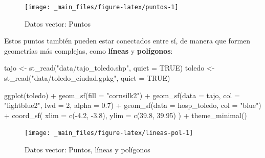 \documentclass[
]{book}
\newenvironment{Shaded}{\begin{snugshade}}{\end{snugshade}}
\newcommand{\AttributeTok}[1]{\textcolor[rgb]{0.77,0.63,0.00}{#1}}
\newcommand{\ConstantTok}[1]{\textcolor[rgb]{0.00,0.00,0.00}{#1}}
\newcommand{\DecValTok}[1]{\textcolor[rgb]{0.00,0.00,0.81}{#1}}
\newcommand{\FloatTok}[1]{\textcolor[rgb]{0.00,0.00,0.81}{#1}}
\newcommand{\FunctionTok}[1]{\textcolor[rgb]{0.00,0.00,0.00}{#1}}
\newcommand{\NormalTok}[1]{#1}
\newcommand{\OtherTok}[1]{\textcolor[rgb]{0.56,0.35,0.01}{#1}}
\newcommand{\SpecialCharTok}[1]{\textcolor[rgb]{0.00,0.00,0.00}{#1}}
\newcommand{\StringTok}[1]{\textcolor[rgb]{0.31,0.60,0.02}{#1}}
\begin{document}
\begin{figure}

{\centering \texttt{[image: \_main\_files/figure-latex/puntos-1]} 

}

\caption{Datos vector: Puntos}\label{fig:puntos}
\end{figure}

Estos puntos también pueden estar conectados entre sí, de manera que formen
geometrías más complejas, como \textbf{líneas} y \textbf{polígonos}:

\begin{Shaded}
\begin{Highlighting}[]

\NormalTok{tajo }\OtherTok{\textless{}{-}} \FunctionTok{st\_read}\NormalTok{(}\StringTok{"data/tajo\_toledo.shp"}\NormalTok{, }\AttributeTok{quiet =} \ConstantTok{TRUE}\NormalTok{)}
\NormalTok{toledo }\OtherTok{\textless{}{-}} \FunctionTok{st\_read}\NormalTok{(}\StringTok{"data/toledo\_ciudad.gpkg"}\NormalTok{, }\AttributeTok{quiet =} \ConstantTok{TRUE}\NormalTok{)}


\FunctionTok{ggplot}\NormalTok{(toledo) }\SpecialCharTok{+}
  \FunctionTok{geom\_sf}\NormalTok{(}\AttributeTok{fill =} \StringTok{"cornsilk2"}\NormalTok{) }\SpecialCharTok{+}
  \FunctionTok{geom\_sf}\NormalTok{(}\AttributeTok{data =}\NormalTok{ tajo, }\AttributeTok{col =} \StringTok{"lightblue2"}\NormalTok{, }\AttributeTok{lwd =} \DecValTok{2}\NormalTok{, }\AttributeTok{alpha =} \FloatTok{0.7}\NormalTok{) }\SpecialCharTok{+}
  \FunctionTok{geom\_sf}\NormalTok{(}\AttributeTok{data =}\NormalTok{ hosp\_toledo, }\AttributeTok{col =} \StringTok{"blue"}\NormalTok{) }\SpecialCharTok{+}
  \FunctionTok{coord\_sf}\NormalTok{(}
    \AttributeTok{xlim =} \FunctionTok{c}\NormalTok{(}\SpecialCharTok{{-}}\FloatTok{4.2}\NormalTok{, }\SpecialCharTok{{-}}\FloatTok{3.8}\NormalTok{),}
    \AttributeTok{ylim =} \FunctionTok{c}\NormalTok{(}\FloatTok{39.8}\NormalTok{, }\FloatTok{39.95}\NormalTok{)}
\NormalTok{  ) }\SpecialCharTok{+}
  \FunctionTok{theme\_minimal}\NormalTok{()}
\end{Highlighting}
\end{Shaded}

\begin{figure}

{\centering \texttt{[image: \_main\_files/figure-latex/lineas-pol-1]} 

}

\caption{Datos vector: Puntos, líneas y polígonos}\label{fig:lineas-pol}
\end{figure}
\end{document}
